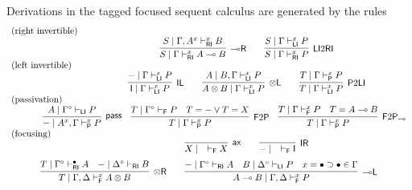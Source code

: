 \documentclass[submission,copyright,creativecommons]{eptcs}
\theoremstyle{definition}
\newtheorem{defn}{Definition}[section]
\newcommand{\tl}{\otimes \mathsf{L}}
\newcommand{\tr}{\otimes \mathsf{R}}
\newcommand{\lright}{{\multimap}\mathsf{R}}
\newcommand{\lleft}{{\multimap}\mathsf{L}}
\newcommand{\pass}{\mathsf{pass}}
\newcommand{\unitl}{\mathsf{IL}}
\newcommand{\unitr}{\mathsf{IR}}
\newcommand{\ax}{\mathsf{ax}}
\newcommand{\ot}{\otimes}
\newcommand{\lolli}{\multimap}
\newcommand{\I}{\mathsf{I}}
\newcommand{\RI}{\mathsf{RI}}
\newcommand{\LI}{\mathsf{LI}}
\newcommand{\Pass}{\mathsf{P}}
\newcommand{\F}{\mathsf{F}}
\newcommand{\xvdash}{\vdash^{x}}
\newcommand{\NMILL}{\texttt{NMILL}}
\newcommand{\SkNMILL}{\NMILL\textsuperscript{\textit{s}}}
\newcommand{\FSkMCC}{\textsf{Free}}
\begin{document}
Derivations in the tagged focused sequent calculus are generated by the rules
\begin{displaymath}
  \begin{array}{lc}
    \text{(right invertible)} & \\ &
    \infer[\lright]{S \mid \Gamma \vdash^{x}_{\RI} A \lolli B}{S \mid \Gamma , A^{x} \vdash^{x}_{\RI} B}
    \qquad
    \infer[\LI 2 \RI]{S \mid \Gamma \vdash^{x}_{\RI} P}{S \mid \Gamma \vdash^{x}_{\LI} P}
    \\
    \text{(left invertible)} & \\ &
    \infer[\unitl]{\I \mid \Gamma \xvdash_{\LI} P}{- \mid \Gamma \xvdash_{\LI} P}
    \qquad
    \infer[\tl]{A \ot B \mid \Gamma \xvdash_{\LI} P}{A \mid B , \Gamma \xvdash_{\LI} P}
    \qquad
    \infer[\Pass 2 \LI]{T \mid \Gamma \xvdash_{\LI} P}{T \mid \Gamma \xvdash_{\Pass} P}
    \\
    \text{(passivation)} & \\ &
    \hspace{-1.7cm}
    \infer[\pass]{- \mid A^{x} , \Gamma \xvdash_{\Pass} P }{
      A\mid \Gamma^{\circ} \vdash_{\LI} P
    }
    \quad
    \infer[\F 2 \Pass]{T \mid \Gamma \xvdash_{\Pass} P}{
      T \mid \Gamma^\circ \vdash_{\F} P &
      T = - \vee T = X
    }
    \quad
    \infer[\F 2 \Pass_{{\lolli}}]{T \mid \Gamma \xvdash_{\Pass} P}{
      T \mid \Gamma \xvdash_{\F} P &
      T = A \lolli B
    }
    \\
    \text{(focusing)} &    \\ &
    \infer[\ax]{X \mid \quad \vdash_{\F} X}{}
    \qquad
    \infer[\unitr]{- \mid \quad \vdash_{\F} \I}{}
    \\[6pt]
    \multicolumn{2}{c}{
    \infer[\tr]{T \mid \Gamma , \Delta \xvdash_{\F} A \ot B}{
      T \mid \Gamma^{\circ} \vdash^{\bullet}_{\RI} A
      &
      - \mid \Delta^{\circ} \vdash_{\RI} B
    }
    \qquad
    \infer[\lleft]{A \lolli B \mid \Gamma , \Delta \xvdash_{\F} P}{
      - \mid \Gamma^{\circ} \vdash_{\RI} A
      &
      B \mid \Delta^{\circ} \vdash_{\LI} P
      &
      x = \bullet \supset \bullet \in \Gamma
    }
    }
  \end{array}
\end{displaymath}
\end{document}
